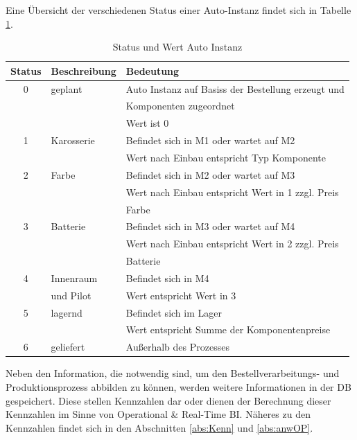 Eine Übersicht der verschiedenen Status einer Auto-Instanz findet sich in Tabelle \ref{tab:status}.
\begin{table}[H]
    \centering
    \begin{tabular}{|c|l|l|}
     \toprule
     \hline
         \textbf{Status}& \textbf{Beschreibung} & \textbf{Bedeutung} \\ \hline
          0 & geplant & Auto Instanz auf Basiss der Bestellung erzeugt und\\
           &&Komponenten zugeordnet\\
           &&Wert ist 0\\ \hline
          1 & Karosserie & Befindet sich in M1 oder wartet auf M2\\
          &&Wert nach Einbau entspricht Typ Komponente\\ \hline
          2 & Farbe & Befindet sich in M2 oder wartet auf M3\\
          &&Wert nach Einbau entspricht Wert in 1 zzgl. Preis \\
          &&Farbe\\ \hline
          3 & Batterie & Befindet sich in M3 oder wartet auf M4\\
          &&Wert nach Einbau entspricht Wert in 2 zzgl. Preis \\
          &&Batterie\\ \hline
          4 & Innenraum & Befindet sich in M4\\
          &und Pilot&Wert entspricht Wert in 3\\ \hline
          5 & lagernd& Befindet sich im Lager\\
          &&Wert entspricht Summe der Komponentenpreise\\ \hline
          6 & geliefert& Außerhalb des Prozesses\\ \hline
    \bottomrule
    \end{tabular}
    \caption{Status und Wert Auto Instanz}
    \label{tab:status}
\end{table}
Neben den Information, die notwendig sind, um den Bestellverarbeitungs- und Produktionsprozess abbilden zu können, werden weitere Informationen in der \ac{DB} gespeichert. Diese stellen Kennzahlen dar oder dienen der Berechnung dieser Kennzahlen im Sinne von Operational \& Real-Time \ac{BI}. Näheres zu den Kennzahlen findet sich in den Abschnitten \ref{abs:Kenn} und \ref{abs:anwOP}.

